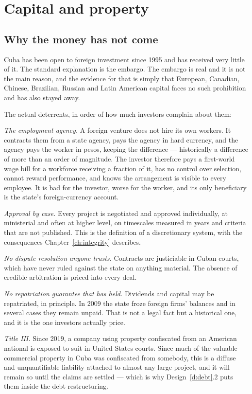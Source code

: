 \chapter{Capital and property}
\label{ch:capital}

\section{Why the money has not come}

Cuba has been open to foreign investment since 1995 and has received very little
of it. The standard explanation is the embargo. The embargo is real and it is not
the main reason, and the evidence for that is simply that European, Canadian,
Chinese, Brazilian, Russian and Latin American capital faces no such prohibition
and has also stayed away.

The actual deterrents, in order of how much investors complain about them:

\emph{The employment agency.} A foreign venture does not hire its own workers. It
contracts them from a state agency, pays the agency in hard currency, and the
agency pays the worker in pesos, keeping the difference --- historically a
difference of more than an order of magnitude. The investor therefore pays a
first-world wage bill for a workforce receiving a fraction of it, has no control
over selection, cannot reward performance, and knows the arrangement is visible
to every employee. It is bad for the investor, worse for the worker, and its only
beneficiary is the state's foreign-currency account.

\emph{Approval by case.} Every project is negotiated and approved individually,
at ministerial and often at higher level, on timescales measured in years and
criteria that are not published. This is the definition of a discretionary
system, with the consequences Chapter~\ref{ch:integrity} describes.

\emph{No dispute resolution anyone trusts.} Contracts are justiciable in Cuban
courts, which have never ruled against the state on anything material. The
absence of credible arbitration is priced into every deal.

\emph{No repatriation guarantee that has held.} Dividends and capital may be
repatriated, in principle. In 2009 the state froze foreign firms' balances and in
several cases they remain unpaid. That is not a legal fact but a historical one,
and it is the one investors actually price.

\emph{Title III.} Since 2019, a company using property confiscated from an
American national is exposed to suit in United States courts. Since much of the
valuable commercial property in Cuba was confiscated from somebody, this is a
diffuse and unquantifiable liability attached to almost any large project, and
it will remain so until the claims are settled --- which is why
Design~\ref{d:debt}.2 puts them inside the debt restructuring.

